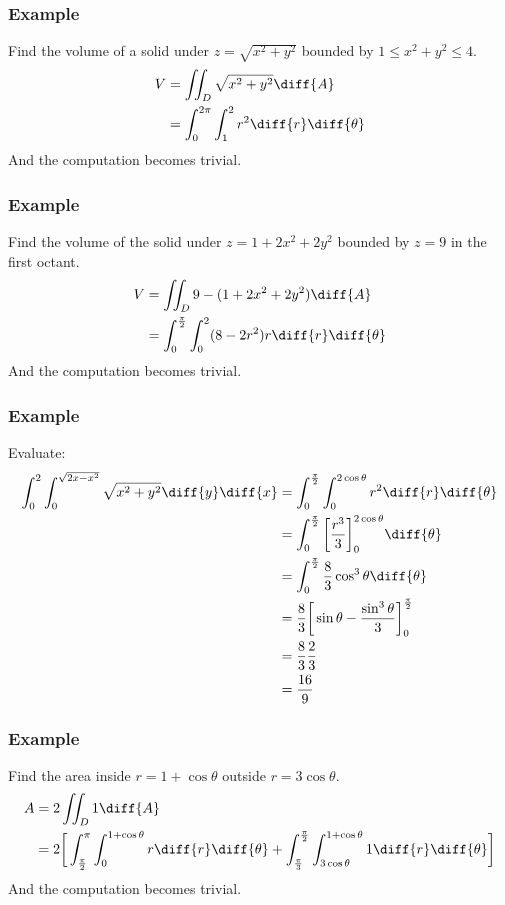 \documentclass{math}
\begin{document}
\subsubsection*{Example}
Find the volume of a solid under \( z = \sqrt{x^2+y^2} \) bounded by
\( 1\le x^2+y^2\le 4 \).
\begin{align*}
  V &= \iint_{D}\sqrt{x^2+y^2}\diff{A} \\
  &= \int_{0}^{2\pi}\int_{1}^{2}r^2\diff{r}\diff{\theta} \\
\end{align*}
And the computation becomes trivial.

\subsubsection*{Example}
Find the volume of the solid under \( z = 1+2x^2+2y^2 \) bounded by
\( z = 9 \) in the first octant.
\begin{align*}
  V &= \iint_{D}9-(1+2x^2+2y^2)\diff{A} \\
  &= \int_{0}^{\frac{\pi}{2}}\int_{0}^{2}(8-2r^2)r\diff{r}\diff{\theta}
\end{align*}
And the computation becomes trivial.

\subsubsection*{Example}
Evaluate:
\begin{align*}
  \int_{0}^{2}\int_{0}^{\sqrt{2x-x^2}}\sqrt{x^2+y^2}\diff{y}\diff{x}
  &= \int_{0}^{\frac{\pi}{2}}\int_{0}^{2\cos\theta}r^2\diff{r}\diff{\theta} \\
  &= \int_{0}^{\frac{\pi}{2}}
    \bigg[\frac{r^3}{3}\bigg]_{0}^{2\cos\theta}\diff{\theta} \\
  &= \int_{0}^{\frac{\pi}{2}}\frac{8}{3}\cos^3\theta\diff{\theta} \\
  &= \frac{8}{3}
    \bigg[\sin\theta-\frac{\sin^3\theta}{3}\bigg]_{0}^{\frac{\pi}{2}} \\
  &= \frac{8}{3}\frac{2}{3} \\
  &= \frac{16}{9}
\end{align*}

\subsubsection*{Example}
Find the area inside \( r = 1+\cos\theta \) outside \( r = 3\cos\theta \).
\begin{align*}
  A &= 2\iint_{D}1\diff{A} \\
  &= 2\bigg[
    \int_{\frac{\pi}{2}}^{\pi}\int_{0}^{1+\cos\theta}r\diff{r}\diff{\theta}+
    \int_{\frac{\pi}{3}}^{\frac{\pi}{2}}
      \int_{3\cos\theta}^{1+\cos\theta}1\diff{r}\diff{\theta}
    \bigg]
\end{align*}
And the computation becomes trivial.
\end{document}
